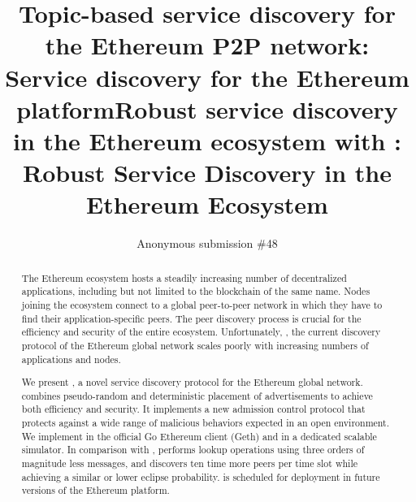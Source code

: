 \documentclass[compsoc, conference, a4paper, 10pt, times]{IEEEtran}
\begin{document}
\title{Topic-based service discovery for the Ethereum P2P network}
\title{\sysname: Service discovery for the Ethereum platform}
\title{Robust service discovery in the Ethereum ecosystem with \sysname}
\title{\sysname: Robust Service Discovery in the Ethereum Ecosystem}
\author{Anonymous submission \#48}
\maketitle
\begin{abstract}

The Ethereum ecosystem hosts a steadily increasing number of decentralized applications, including but not limited to the blockchain of the same name. Nodes joining the ecosystem connect to a global peer-to-peer network in which they have to find their application-specific peers. The peer discovery process is crucial for the efficiency and security of the entire ecosystem. Unfortunately, \discv, the current discovery protocol of the Ethereum global network scales poorly with increasing numbers of applications and nodes.

We present \sysname, a novel service discovery protocol for the Ethereum global network. \sysname combines pseudo-random and deterministic placement of advertisements to achieve both efficiency and security.
It implements a new admission control protocol that protects against a wide range of malicious behaviors expected in an open environment. 
We implement \sysname in the official Go Ethereum client (Geth) and in a dedicated scalable simulator.
In comparison with \discv, \sysname performs lookup operations using three orders of magnitude less messages, and discovers ten time more peers per time slot while achieving a similar or lower eclipse probability. 
\sysname is scheduled for deployment in future versions of the Ethereum platform.
\end{abstract}





















%
\clearpage



\end{document}
